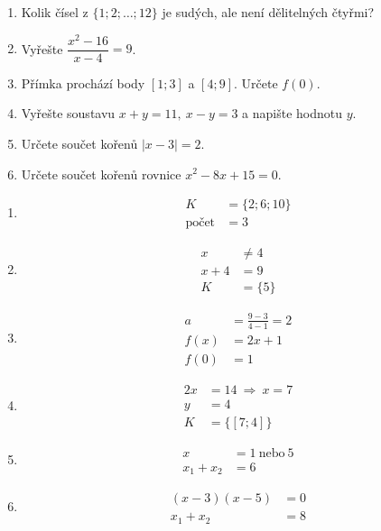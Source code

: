 \documentclass[11pt,a4paper]{article}
\begin{document}
\begin{zadaniReseniBox}[title={Domácí úkol}]
\begin{enumerate}[label=\alph*),itemsep=2pt]
\item Kolik čísel z $\{1;2;\dots;12\}$ je sudých, ale není dělitelných čtyřmi?
\item Vyřešte $\dfrac{x^2-16}{x-4}=9$.
\item Přímka prochází body $[1;3]$ a $[4;9]$. Určete $f(0)$.
\item Vyřešte soustavu $x+y=11,\ x-y=3$ a napište hodnotu $y$.
\item Určete součet kořenů $|x-3|=2$.
\item Určete součet kořenů rovnice $x^2-8x+15=0$.
\end{enumerate}
\tcblower
\begin{enumerate}[label=\alph*),itemsep=2pt]
\item
\[
\begin{aligned}
K&=\{2;6;10\}\\
\text{počet}&=3
\end{aligned}
\]
\item
\[
\begin{aligned}
x&\ne4\\
x+4&=9\\
K&=\{5\}
\end{aligned}
\]
\item
\[
\begin{aligned}
a&=\frac{9-3}{4-1}=2\\
f(x)&=2x+1\\
f(0)&=1
\end{aligned}
\]
\item
\[
\begin{aligned}
2x&=14\ \Rightarrow\ x=7\\
y&=4\\
K&=\{[7;4]\}
\end{aligned}
\]
\item
\[
\begin{aligned}
x&=1\ \text{nebo}\ 5\\
x_1+x_2&=6
\end{aligned}
\]
\item
\[
\begin{aligned}
(x-3)(x-5)&=0\\
x_1+x_2&=8
\end{aligned}
\]
\end{enumerate}
\end{zadaniReseniBox}
\end{document}
